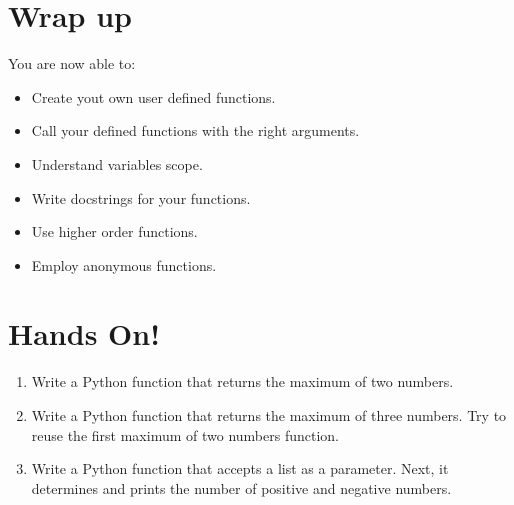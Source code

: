 \documentclass[aspectratio=1610,slidestop]{beamer}
\begin{document}
\section*{Wrap up}

\begin{pframe}
 You are now able to:
 \begin{itemize}
  \item Create yout own user defined functions.
  \item Call your defined functions with the right arguments.
  \item Understand variables scope.
  \item Write docstrings for your functions.
  \item Use higher order functions.
  \item Employ anonymous functions.
 \end{itemize}

\end{pframe}


\begin{pframe}
 \begin{center}
  
 \end{center}
\end{pframe}


\section{Hands On!}

\begin{pframe}
 \vspace{-0.5cm}
 \begin{enumerate}
  \item Write a Python function that returns the maximum of two numbers.
  \item Write a Python function that returns the maximum of three numbers.
  Try to reuse the first maximum of two numbers function.
  \item Write a Python function that accepts a list as a parameter.
  Next, it determines and prints the number of positive and negative numbers.
 \end{enumerate}
\end{pframe}


\end{document}
